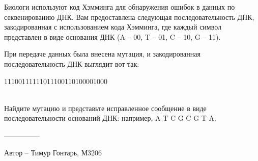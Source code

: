 \question
Биологи используют код Хэмминга для обнаружения ошибок в данных по секвенированию ДНК. Вам предоставлена следующая последовательность ДНК, закодированная с использованием кода Хэмминга, где каждый символ представлен в виде основания ДНК (A -- 00, T -- 01, C -- 10, G -- 11).

При передаче данных была внесена мутация, и закодированная последовательность ДНК выглядит вот так: 
\begin{center}
11100111111011100110100001000
\end{center}
\\
Найдите мутацию и представьте исправленное сообщение в виде последовательности оснований ДНК: например, A T C G C G T A.

---------------

Автор -- Тимур Гонтарь, М3206